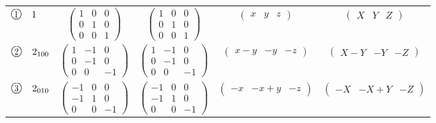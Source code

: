 \documentclass[fleqn,10pt,landscape]{jsarticle}
\begin{document}
\begin{center}
\begin{longtable}{lcccc}
$ {\ooalign{\hfil\resizebox{.8\width}{\height}{1}\hfil\crcr\raise.1ex\hbox{\large$\bigcirc$}}}\quad 1 $ & $ \begin{pmatrix} 1 & 0 & 0 \\ 0 & 1 & 0 \\ 0 & 0 & 1 \end{pmatrix} $ & $ \begin{pmatrix} 1 & 0 & 0 \\ 0 & 1 & 0 \\ 0 & 0 & 1 \end{pmatrix} $ & $ \begin{pmatrix} x & y & z \end{pmatrix} $ & $ \begin{pmatrix} X & Y & Z \end{pmatrix} $ \\
$ {\ooalign{\hfil\resizebox{.8\width}{\height}{2}\hfil\crcr\raise.1ex\hbox{\large$\bigcirc$}}}\quad 2{}_{100} $ & $ \begin{pmatrix} 1 & -1 & 0 \\ 0 & -1 & 0 \\ 0 & 0 & -1 \end{pmatrix} $ & $ \begin{pmatrix} 1 & -1 & 0 \\ 0 & -1 & 0 \\ 0 & 0 & -1 \end{pmatrix} $ & $ \begin{pmatrix} x - y & - y & - z \end{pmatrix} $ & $ \begin{pmatrix} X - Y & - Y & - Z \end{pmatrix} $ \\
$ {\ooalign{\hfil\resizebox{.8\width}{\height}{3}\hfil\crcr\raise.1ex\hbox{\large$\bigcirc$}}}\quad 2{}_{010} $ & $ \begin{pmatrix} -1 & 0 & 0 \\ -1 & 1 & 0 \\ 0 & 0 & -1 \end{pmatrix} $ & $ \begin{pmatrix} -1 & 0 & 0 \\ -1 & 1 & 0 \\ 0 & 0 & -1 \end{pmatrix} $ & $ \begin{pmatrix} - x & - x + y & - z \end{pmatrix} $ & $ \begin{pmatrix} - X & - X + Y & - Z \end{pmatrix} $ \\

\end{longtable}
\end{center}
\end{document}
